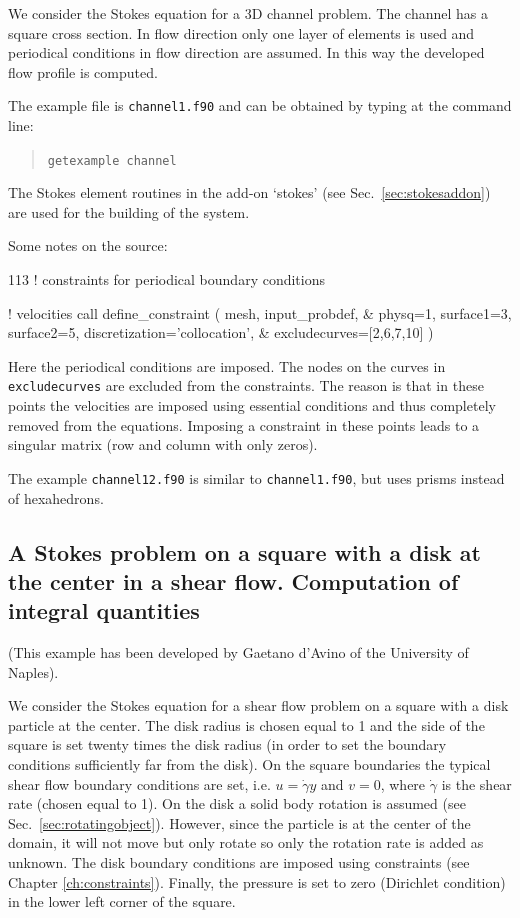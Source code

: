 We consider the Stokes equation for a 3D channel problem. The channel has
a square cross section. In flow direction only one layer of elements is used
and periodical conditions in flow direction are assumed. In this way the
developed flow profile is computed.

The example file is \texttt{channel1.f90} and can be obtained by typing at the
command line:
\begin{quote}
   \texttt{getexample channel}
\end{quote}
                                                                                
The Stokes element routines
in the add-on `stokes' (see Sec.~\ref{sec:stokesaddon}) are used for
the building of the system. 

Some notes on the source:
\begin{listing}{113}
! constraints for periodical boundary conditions

! velocities
  call define_constraint ( mesh, input_probdef, &
    physq=1, surface1=3, surface2=5, discretization='collocation', &
      excludecurves=[2,6,7,10] )

\end{listing}
Here the periodical conditions are imposed. The nodes on the curves in
\texttt{excludecurves} are excluded from the constraints.
The reason is that in these points the velocities are imposed
     using essential conditions and thus completely removed from the equations.
     Imposing a constraint in these points leads to a singular matrix (row and
     column with only zeros).
     
The example \texttt{channel12.f90} is similar to \texttt{channel1.f90}, but uses prisms instead of hexahedrons.

\subsection{A Stokes problem on a square with a disk at the center in a shear flow. Computation of integral quantities}
\label{sec:exampleintegration}

(This example has been developed by Gaetano d'Avino of the University of Naples).

We consider the Stokes equation for a shear flow problem on a square with a disk particle at the center. The
disk radius is chosen equal to 1 and the side of the square is set twenty times the disk radius (in order to set
the boundary conditions sufficiently far from the disk). On the square boundaries the typical shear flow
boundary conditions are set, i.e. $u=\dot{\gamma}y$ and $v=0$, where $\dot{\gamma}$ is the shear rate (chosen
equal to 1). On the disk a solid body rotation is assumed (see Sec.~\ref{sec:rotatingobject}). However, since the particle
is at the center of the domain, it will not move but only rotate so only the rotation rate is added as unknown.
The disk boundary conditions are imposed using constraints (see Chapter \ref{ch:constraints}). Finally, the
pressure is set to zero (Dirichlet condition) in the lower left corner of the square.

